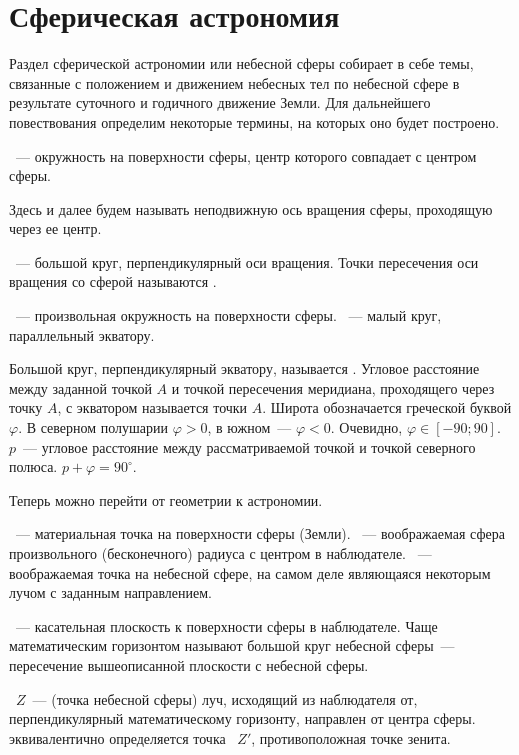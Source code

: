 \section{Сферическая астрономия}

Раздел сферической астрономии или небесной сферы собирает в себе темы, связанные с положением и движением небесных тел по небесной сфере в результате суточного и годичного движение Земли. Для дальнейшего повествования определим некоторые термины, на которых оно будет построено.

~--- окружность на поверхности сферы, центр которого совпадает с центром сферы.

Здесь и далее  будем называть неподвижную ось вращения сферы, проходящую через ее центр. 

~--- большой круг, перпендикулярный оси вращения. Точки пересечения оси вращения со сферой называются .

~--- произвольная окружность на поверхности сферы. ~--- малый круг, параллельный экватору.

Большой круг, перпендикулярный экватору, называется . Угловое расстояние между заданной точкой $A$ и точкой пересечения меридиана, проходящего через точку $A$, с экватором называется  точки $A$. Широта обозначается греческой буквой $\varphi$. В северном полушарии $\varphi > 0$, в южном~--- $\varphi < 0$. Очевидно, $\varphi \in [-90; 90]$. ~$p$~--- угловое расстояние между рассматриваемой точкой и точкой северного полюса. $p + \varphi = 90^\circ$.

Теперь можно перейти от геометрии к астрономии. 

~--- материальная точка на поверхности сферы (Земли). ~--- воображаемая сфера произвольного (бесконечного) радиуса с центром в наблюдателе. ~--- воображаемая точка на небесной сфере, на самом деле являющаяся некоторым лучом с заданным направлением.

~--- касательная плоскость к поверхности сферы в наблюдателе. Чаще математическим горизонтом называют большой круг небесной сферы~--- пересечение вышеописанной плоскости с небесной сферы. 

~$Z$~--- (точка небесной сферы) луч, исходящий из наблюдателя от, перпендикулярный математическому горизонту, направлен от центра сферы. эквивалентично определяется точка ~$Z'$, противоположная точке зенита.

